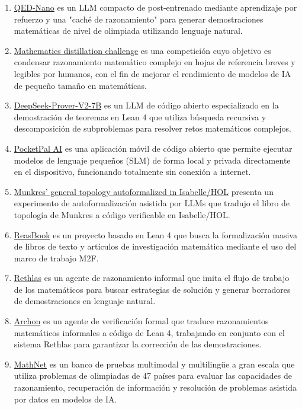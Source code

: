 \documentclass[12pt,a4paper]{article}
\begin{document}
\begin{enumerate}
\item \href{https://huggingface.co/lm-provers/QED-Nano}{QED-Nano} es un LLM compacto de post-entrenado mediante aprendizaje por refuerzo y una "caché de razonamiento" para generar demostraciones matemáticas de nivel de olimpiada utilizando lenguaje natural.
\item \href{https://youtu.be/HcvVC3ioVpM}{Mathematics distillation challenge} es una competición cuyo objetivo es condensar razonamiento matemático complejo en hojas de referencia breves y legibles por humanos, con el fin de mejorar el rendimiento de modelos de IA de pequeño tamaño en matemáticas.
\item \href{https://huggingface.co/deepseek-ai/DeepSeek-Prover-V2-7B}{DeepSeek-Prover-V2-7B} es un LLM de código abierto especializado en la demostración de teoremas en Lean 4 que utiliza búsqueda recursiva y descomposición de subproblemas para resolver retos matemáticos complejos.
\item \href{https://pocketpal.dev/}{PocketPal AI} es una aplicación móvil de código abierto que permite ejecutar modelos de lenguaje pequeños (SLM) de forma local y privada directamente en el dispositivo, funcionando totalmente sin conexión a internet.
\item \href{https://arxiv.org/abs/2604.07455v1}{Munkres' general topology autoformalized in Isabelle/HOL} presenta un experimento de autoformalización asistida por LLMs que tradujo el libro de topología de Munkres a código verificable en Isabelle/HOL.
\item \href{https://github.com/optpku/ReasBook}{ReasBook} es un proyecto basado en Lean 4 que busca la formalización masiva de libros de texto y artículos de investigación matemática mediante el uso del marco de trabajo M2F.
\item \href{https://github.com/frenzymath/Rethlas}{Rethlas} es un agente de razonamiento informal que imita el flujo de trabajo de los matemáticos para buscar estrategias de solución y generar borradores de demostraciones en lenguaje natural.
\item \href{https://github.com/frenzymath/Archon}{Archon} es un agente de verificación formal que traduce razonamientos matemáticos informales a código de Lean 4, trabajando en conjunto con el sistema Rethlas para garantizar la corrección de las demostraciones.
\item \href{https://mathnet.mit.edu/}{MathNet} es un banco de pruebas multimodal y multilingüe a gran escala que utiliza problemas de olimpiadas de 47 países para evaluar las capacidades de razonamiento, recuperación de información y resolución de problemas asistida por datos en modelos de IA.

\end{enumerate}
\end{document}
